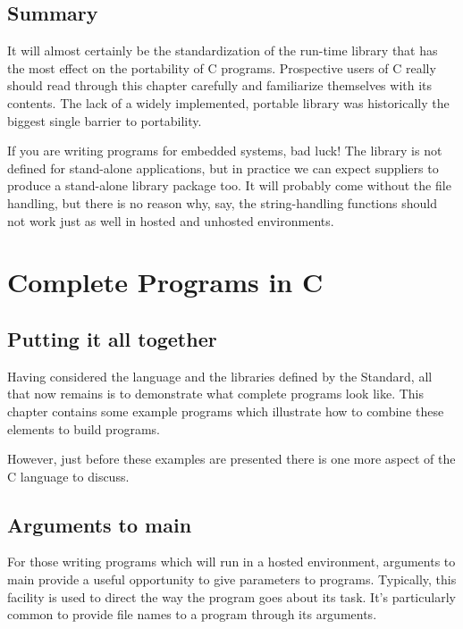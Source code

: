  
        \section{Summary}
        


  It will almost certainly be the standardization of the run-time library
   that has the most effect on the portability of C programs.  Prospective
   users of C really should read through this chapter carefully and
   familiarize themselves with its contents.  The lack of a widely implemented,
   portable library was historically the biggest single barrier to
   portability.


  If you are writing programs for embedded systems, bad luck!  The library
   is not defined for stand-alone applications, but in practice we can expect
   suppliers to produce a stand-alone library package too.  It will probably
   come without the file handling, but there is no reason why, say, the
   string-handling functions should not work just as well in hosted and
   unhosted environments.


 \chapter{Complete Programs in C}


        \section{Putting it all together}
        

  

  Having considered the language and the libraries defined by the
   Standard, all that now remains is to demonstrate what complete programs
   look like. This chapter contains some example programs which illustrate
   how to combine these elements to build programs.


  However, just before these examples are presented there is one more
   aspect of the C language to discuss.


 
        \section{Arguments to main}
        

  

  For those writing programs which will run in a hosted environment,
   arguments to main provide a useful opportunity to give parameters to
   programs. Typically, this facility is used to direct the way the program
   goes about its task. It's particularly common to provide file names to a
   program through its arguments.


